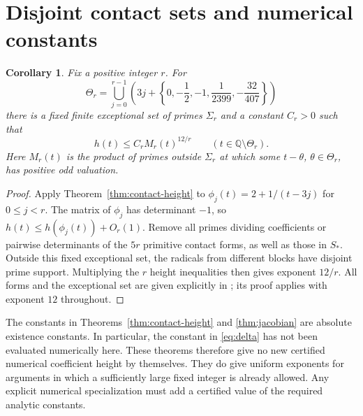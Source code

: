 \documentclass[11pt,a4paper]{article}
\newtheorem{corollary}[theorem]{Corollary}
\theoremstyle{definition}
\newcommand{\Q}{\mathbb Q}
\begin{document}
\section{Disjoint contact sets and numerical constants}

\begin{corollary}\label{cor:amplification}
Fix a positive integer $r$. For
\[
 \Theta_r=\bigcup_{j=0}^{r-1}
 \left(3j+\left\{0,-\frac12,-1,
                       \frac1{2399},-\frac{32}{407}\right\}\right)
\]
there is a fixed finite exceptional set of primes $\Sigma_r$
and a constant $C_r>0$ such that
\[
 h(t)\le C_r M_r(t)^{12/r}
 \qquad(t\in\Q\setminus\Theta_r).
\]
Here $M_r(t)$ is the product of primes outside $\Sigma_r$
at which some $t-\theta$, $\theta\in\Theta_r$, has positive
odd valuation.
\end{corollary}
\begin{proof}
Apply Theorem~\ref{thm:contact-height} to
$\phi_j(t)=2+1/(t-3j)$ for $0\le j<r$.
The matrix of $\phi_j$ has determinant $-1$, so
$h(t)\le h(\phi_j(t))+O_r(1)$.
Remove all primes dividing coefficients or pairwise determinants
of the $5r$ primitive contact forms, as well as those in $S_*$.
Outside this fixed exceptional set, the radicals from different
blocks have disjoint prime support. Multiplying the $r$ height
inequalities then gives exponent $12/r$. All forms and the
exceptional set are given explicitly in
\cite[Sections~1--2]{Amplification}; its proof applies with
exponent $12$ throughout.
\end{proof}

The constants in Theorems~\ref{thm:contact-height} and
\ref{thm:jacobian} are absolute existence constants. In particular,
the constant in \eqref{eq:delta} has not been evaluated numerically
here. These theorems therefore give no new certified numerical
coefficient height by themselves. They do give uniform exponents
for arguments in which a sufficiently large fixed integer is
already allowed. Any explicit numerical specialization must
add a certified value of the required analytic constants.
\end{document}
